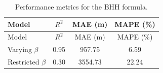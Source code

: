 \begin{longtable}{lccc}
\caption{Performance metrics for the BHH formula.} \label{tab:results_small} \\
\hline
Model & $R^2$ & MAE (m) & MAPE (\%) \\
\hline
\endfirsthead
\hline
Model & $R^2$ & MAE (m) & MAPE (\%) \\
\hline
\endhead
Varying $\beta$ & 0.95 & 957.75 & 6.59\\
Restricted $\beta$ & 0.30 & 3554.73 & 22.24\\
\hline
\end{longtable}
